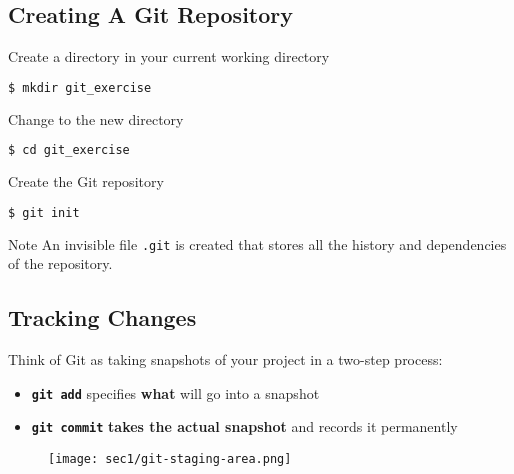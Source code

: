 \subsection{Creating A Git Repository}\hypertarget{sec1.3}{}


\begin{frame}[fragile]
\emptyframetitle

  Create a directory in your current working directory
  \begin{lstlisting}[language=bash]
    $ mkdir git_exercise
  \end{lstlisting}

  Change to the new directory
  \begin{lstlisting}[language=bash]
    $ cd git_exercise
  \end{lstlisting}

  Create the Git repository
  \begin{lstlisting}[language=bash]
    $ git init
  \end{lstlisting}

  \begin{block}{Note}
An invisible file \texttt{.git} is created that stores all the history and dependencies of the repository.
  \end{block}

\end{frame}

\subsection{Tracking Changes}\hypertarget{sec1.4}{}

\begin{frame}[fragile]
\emptyframetitle

  Think of Git as taking snapshots of your project in a two-step process:
  \begin{itemize}
    \item \texttt{\textbf{git add}} specifies \textbf{what} will go into a snapshot
    \item \texttt{\textbf{git commit}} \textbf{takes the actual snapshot} and records it permanently
  \end{itemize}

  \begin{figure}[h]
    \texttt{[image: sec1/git-staging-area.png]}
  \end{figure}

\end{frame}

